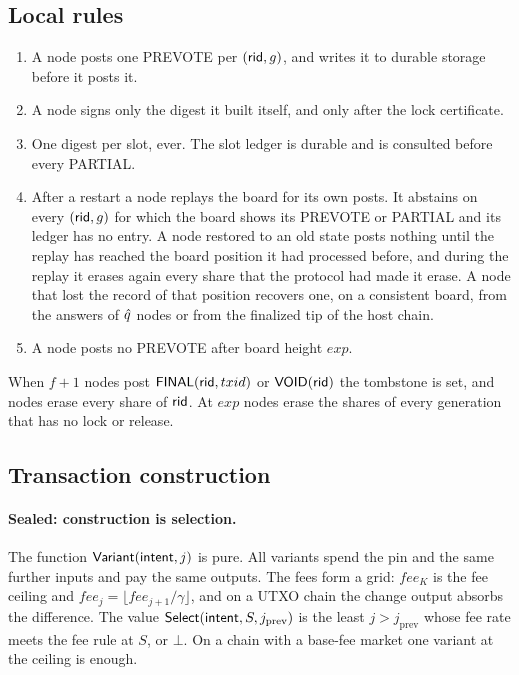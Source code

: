 \subsection{Local rules}\label{sec:rules}

\begin{enumerate}[leftmargin=1.7em,itemsep=1pt]
\item A node posts one PREVOTE per $(\mathsf{rid}, g)$, and writes it to durable storage before it posts it.
\item A node signs only the digest it built itself, and only after the lock certificate.
\item One digest per slot, ever. The slot ledger is durable and is consulted before every PARTIAL.
\item After a restart a node replays the board for its own posts. It abstains on every $(\mathsf{rid}, g)$ for which the board shows its PREVOTE or PARTIAL and its ledger has no entry. A node restored to an old state posts nothing until the replay has reached the board position it had processed before, and during the replay it erases again every share that the protocol had made it erase. A node that lost the record of that position recovers one, on a consistent board, from the answers of $\hat{q}$ nodes or from the finalized tip of the host chain.
\item A node posts no PREVOTE after board height $exp$.
\end{enumerate}

When $f+1$ nodes post $\textsf{FINAL}(\mathsf{rid}, txid)$ or $\textsf{VOID}(\mathsf{rid})$ the tombstone is set, and nodes erase every share of $\mathsf{rid}$. At $exp$ nodes erase the shares of every generation that has no lock or release.

\subsection{Transaction construction}\label{sec:tx}

\paragraph{Sealed: construction is selection.} The function $\mathsf{Variant}(\textsf{intent}, j)$ is pure. All variants spend the pin and the same further inputs and pay the same outputs. The fees form a grid: $fee_K$ is the fee ceiling and $fee_j = \lfloor fee_{j+1}/\gamma \rfloor$, and on a UTXO chain the change output absorbs the difference. The value $\mathsf{Select}(\textsf{intent}, S, j_{\mathrm{prev}})$ is the least $j > j_{\mathrm{prev}}$ whose fee rate meets the fee rule at $S$, or $\bot$. On a chain with a base-fee market one variant at the ceiling is enough.

